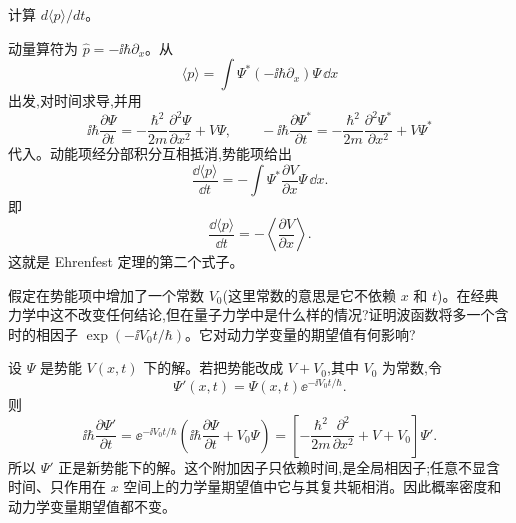 \begin{question}
计算 $d\langle p\rangle/dt$。
\begin{solution}
动量算符为 $\hat p=-\ii\hbar\partial_x$。从
\[
\langle p\rangle=\int \Psi^*(-\ii\hbar\partial_x)\Psi\,\dd x
\]
出发,对时间求导,并用
\[
\ii\hbar\frac{\partial\Psi}{\partial t}= -\frac{\hbar^2}{2m}\frac{\partial^2\Psi}{\partial x^2}+V\Psi,
\qquad
-\ii\hbar\frac{\partial\Psi^*}{\partial t}= -\frac{\hbar^2}{2m}\frac{\partial^2\Psi^*}{\partial x^2}+V\Psi^*
\]
代入。动能项经分部积分互相抵消,势能项给出
\[
\frac{\dd\langle p\rangle}{\dd t}
=-\int \Psi^*\frac{\partial V}{\partial x}\Psi\,\dd x.
\]
即
\[
\boxed{\displaystyle \frac{\dd\langle p\rangle}{\dd t}= -\left\langle \frac{\partial V}{\partial x}\right\rangle.}
\]
这就是 Ehrenfest 定理的第二个式子。
\end{solution}
\end{question}

\begin{question}
假定在势能项中增加了一个常数 $V_0$(这里常数的意思是它不依赖 $x$ 和 $t$)。在经典力学中这不改变任何结论,但在量子力学中是什么样的情况?证明波函数将多一个含时的相因子 $\exp(-\ii V_0t/\hbar)$。它对动力学变量的期望值有何影响?
\begin{solution}
设 $\Psi$ 是势能 $V(x,t)$ 下的解。若把势能改成 $V+V_0$,其中 $V_0$ 为常数,令
\[
\Psi'(x,t)=\Psi(x,t)\ee^{-\ii V_0t/\hbar}.
\]
则
\[
\ii\hbar\frac{\partial\Psi'}{\partial t}
=\ee^{-\ii V_0t/\hbar}\left(\ii\hbar\frac{\partial\Psi}{\partial t}+V_0\Psi\right)
=\left[-\frac{\hbar^2}{2m}\frac{\partial^2}{\partial x^2}+V+V_0\right]\Psi'.
\]
所以 $\Psi'$ 正是新势能下的解。这个附加因子只依赖时间,是全局相因子;任意不显含时间、只作用在 $x$ 空间上的力学量期望值中它与其复共轭相消。因此概率密度和动力学变量期望值都不变。
\end{solution}
\end{question}

